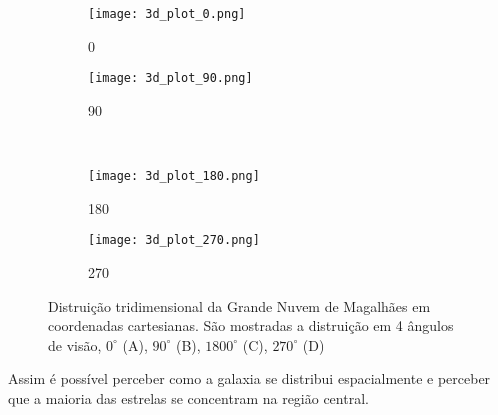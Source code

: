 \begin{figure}[!ht]
\centering
\begin{subfigure}{.5\textwidth}
\centering
\texttt{[image: 3d\_plot\_0.png]}
\caption{0}
\end{subfigure}%
\begin{subfigure}{.5\textwidth}
\centering
\texttt{[image: 3d\_plot\_90.png]}
\caption{90}
\end{subfigure}
\\
\begin{subfigure}{.5\textwidth}
\centering
\texttt{[image: 3d\_plot\_180.png]}
\caption{180}
\end{subfigure}%
\begin{subfigure}{.5\textwidth}
\centering
\texttt{[image: 3d\_plot\_270.png]}
\caption{270}
\end{subfigure}
\caption[Distruição 3D da Grande Nuvem de Magalhães.]{Distruição tridimensional da Grande Nuvem de Magalhães em coordenadas cartesianas. São mostradas a distruição em 4 ângulos de visão, $0^\circ$ (A), $90^\circ$ (B), $1800^\circ$ (C), $270^\circ$ (D) }
\label{fig:plot3d}
\end{figure}

Assim é possível perceber como a galaxia se distribui espacialmente e perceber que a maioria das estrelas se concentram na região central.


